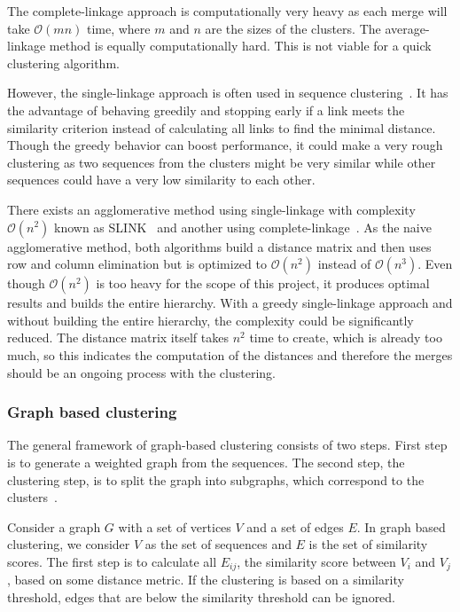 The complete-linkage approach is computationally very heavy as each merge will
take $\mathcal{O}(mn)$ time, where $m$ and $n$ are the sizes of the clusters.
The average-linkage method is equally computationally hard. This is not viable
for a quick clustering algorithm.

However, the single-linkage approach is often used in sequence
clustering~\cite[pp. 62-63]{dong}. It has the advantage of behaving greedily
and stopping early if a link meets the similarity criterion instead of
calculating all links to find the minimal distance. Though the greedy behavior
can boost performance, it could make a very rough clustering as two sequences
from the clusters might be very similar while other sequences could have a very
low similarity to each other.

There exists an agglomerative method using single-linkage with complexity
$\mathcal{O}(n^2)$ known as SLINK~\cite{sibson} and another using
complete-linkage~\cite{defays}. As the naive agglomerative method, both
algorithms build a distance matrix and then uses row and column elimination but
is optimized to $\mathcal{O}(n^2)$ instead of $\mathcal{O}(n^3)$. Even though
$\mathcal{O}(n^2)$ is too heavy for the scope of this project, it produces
optimal results and builds the entire hierarchy. With a greedy single-linkage
approach and without building the entire hierarchy, the complexity could be
significantly reduced.  The distance matrix itself takes $n^2$ time to create,
which is already too much, so this indicates the computation of the distances
and therefore the merges should be an ongoing process with the clustering.


\subsubsection{Graph based clustering}

The general framework of graph-based clustering consists of two steps. First
step is to generate a weighted graph from the sequences. The second step, the
clustering step, is to split the graph into subgraphs, which correspond to the
clusters~\cite[pp. 64-65]{dong}.

Consider a graph $G$ with a set of vertices $V$ and a set of edges $E$. In
graph based clustering, we consider $V$ as the set of sequences and $E$ is the
set of similarity scores. The first step is to calculate all $E_{ij}$, the
similarity score between $V_i$ and $V_j$, based on some distance metric. If the
clustering is based on a similarity threshold, edges that are below the
similarity threshold can be ignored.

